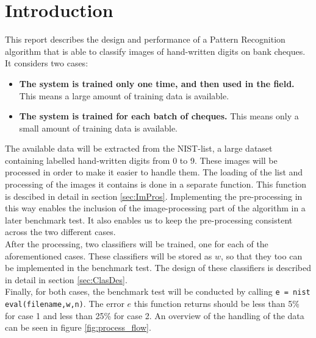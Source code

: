  \section{Introduction}
  \label{Intro}
  This report describes the design and performance of a Pattern Recognition algorithm that is able to classify images of hand-written digits on bank cheques. It considers two cases:
  \begin{itemize}
  	\item \textbf{The system is trained only one time, and then used in the field.} This means a large amount of training data is available.
  	\item \textbf{The system is trained for each batch of cheques.} This means only a small amount of training data is available.
  \end{itemize}
The available data will be extracted from the NIST-list, a large dataset containing labelled hand-written digits from 0 to 9. These images will be processed in order to make it easier to handle them. The loading of the list and processing of the images it contains is done in a separate function.  This function is descibed in detail in section \ref{sec:ImPros}. Implementing the pre-processing in this way enables the inclusion of the image-processing part of the algorithm in a later benchmark test. It also enables us to keep the pre-processing consistent across the two different cases.\\
\indent After the processing, two classifiers will be trained, one for each of the aforementioned cases. These classifiers will be stored as $w$, so that they too can be implemented in the benchmark test. The design of these classifiers is described in detail in section \ref{sec:ClasDes}. \\
\indent Finally, for both cases, the benchmark test will be conducted by calling \texttt{e = nist eval(filename,w,n)}. The error $e$ this function returns should be less than 5\% for case 1 and less than 25\% for case 2. An overview of the handling of the data can be seen in figure \ref{fig:process_flow}.
